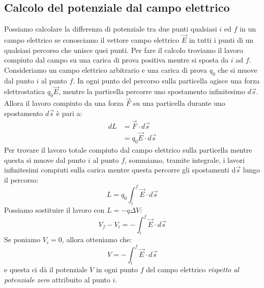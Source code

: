 \documentclass[12pt]{report}
\begin{document}
	\subsection{Calcolo del potenziale dal campo elettrico}
	Possiamo calcolare la differenza di potenziale tra due punti qualsiasi $i$ ed $f$ in un campo elettrico se conosciamo il vettore campo elettrico $\vec{E}$ in tutti i punti di un qualsiasi percorso che unisce quei punti. Per fare il calcolo troviamo il lavoro compiuto dal campo su una carica di prova positiva mentre si sposta da $i$ ad $f$. \\
	Consideriamo un campo elettrico arbitrario e una carica di prova $q_0$ che si muove dal punto $i$ al punto $f$. In ogni punto del percorso sulla particella agisce una forza elettrostatica $q_0\vec{E}$, mentre la particella percorre uno spostamento infinitesimo $d\vec{s}$. Allora il lavoro compiuto da una forza $\vec{F}$ su una particella durante uno spostamento $d\vec{s}$ è pari a:
	\begin{align*}
		dL &= \vec{F} \cdot d\vec{s} \\
		&= q_0\vec{E} \cdot d\vec{s}
	\end{align*}
	Per trovare il lavoro totale compiuto dal campo elettrico sulla particella mentre questa si muove dal punto $i$ al punto $f$, sommiamo, tramite integrale, i lavori infinitesimi compiuti sulla carica mentre questa percorre gli spostamenti d$\vec{s}$ lungo il percorso:
	\[
	L = q_0\int_{i}^{f}\vec{E}\cdot d\vec{s}
	\]
	Possiamo sostituire il lavoro con $L = -q\Delta V$:
	\[
	V_f - V_i = -\int_{i}^{f}\vec{E}\cdot d\vec{s}
	\]
	Se poniamo $V_i = 0$, allora otteniamo che:
	\[
	V = -\int_{i}^{f}\vec{E} \cdot d\vec{s}
	\]
	e questa ci dà il potenziale $V$ in ogni punto $f$ del campo elettrico \textit{rispetto al potenziale zero} attribuito al punto $i$.
\end{document}
